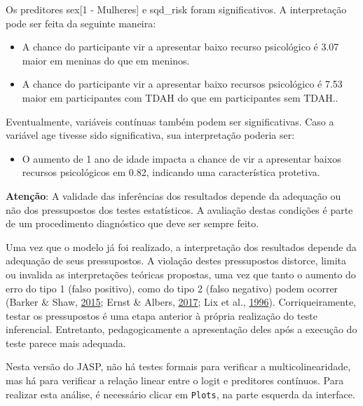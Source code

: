 \documentclass[
]{book}
\providecommand{\tightlist}{%
  \setlength{\itemsep}{0pt}\setlength{\parskip}{0pt}}
\begin{document}
Os preditores sex{[}1 - Mulheres{]} e sqd\_risk foram significativos. A
interpretação pode ser feita da seguinte maneira:

\begin{itemize}
\tightlist
\item
  A chance do participante vir a apresentar baixo recurso psicológico é
  3.07 maior em meninas do que em meninos.
\item
  A chance do participante vir a apresentar baixo recursos psicológico é
  7.53 maior em participantes com TDAH do que em participantes sem
  TDAH..
\end{itemize}

Eventualmente, variáveis contínuas também podem ser significativas. Caso
a variável age tivesse sido significativa, sua interpretação poderia
ser:

\begin{itemize}
\tightlist
\item
  O aumento de 1 ano de idade impacta a chance de vir a apresentar
  baixos recursos psicológicos em 0.82, indicando uma característica
  protetiva.
\end{itemize}

\begin{warning}

\textbf{Atenção}: A validade das inferências dos resultados depende da
adequação ou não dos pressupostos dos testes estatísticos. A avaliação
destas condições é parte de um procedimento diagnóstico que deve ser
sempre feito.

\end{warning}

Uma vez que o modelo já foi realizado, a interpretação dos resultados
depende da adequação de seus pressupostos. A violação destes
pressupostos distorce, limita ou invalida as interpretações teóricas
propostas, uma vez que tanto o aumento do erro do tipo 1 (falso
positivo), como do tipo 2 (falso negativo) podem ocorrer (Barker \&
Shaw, \protect\hyperlink{ref-Barker2015}{2015}; Ernst \& Albers,
\protect\hyperlink{ref-Ernst2017}{2017}; Lix et al.,
\protect\hyperlink{ref-Lix1996}{1996}). Corriqueiramente, testar os
pressupostos é uma etapa anterior à própria realização do teste
inferencial. Entretanto, pedagogicamente a apresentação deles após a
execução do teste parece mais adequada.

Nesta versão do JASP, não há testes formais para verificar a
multicolinearidade, mas há para verificar a relação linear entre o logit
e preditores contínuos. Para realizar esta análise, é necessário clicar
em \texttt{Plots}, na parte esquerda da interface.
\end{document}
